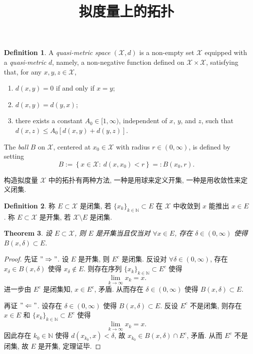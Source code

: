 \documentclass[a4paper,11pt]{article}
\title{拟度量上的拓扑}
\newtheorem{theorem}{Theorem}[section]
\theoremstyle{definition}
\newtheorem{definition}[theorem]{Definition}
\begin{document}
\maketitle

\begin{definition} \label{10.21.1}
A \emph{quasi-metric space} $ (\mathcal{X}, d) $ is a non-empty set $ \mathcal{X} $ equipped with a \emph{quasi-metric} $ d $,
namely, a non-negative function defined on $ \mathcal{X} \times \mathcal{X} $, satisfying that, for any $ x, y, z \in \mathcal{X} $,
    \begin{enumerate}[{\rm(i)}]
        \item $ d(x, y) = 0 $ if and only if $ x = y $;
        \item $ d(x, y) = d(y, x) $;
        \item there exists a constant $ A_0 \in [1, \infty) $, independent of $ x $, $ y $,
            and $ z $, such that $ d(x, z) \leq A_0 [d(x, y) + d(y, z)] $.
    \end{enumerate}
\end{definition}

The \emph{ball} $ B $ on $ \mathcal{X} $, centered at $ x_0 \in \mathcal{X} $ with radius $ r \in (0, \infty) $, 
is defined by setting
$$
    B := \left\{x \in \mathcal{X} :\ d(x, x_0) < r \right\} =: B \left( x_0, r \right).
$$

构造拟度量 $ \mathcal{X} $ 中的拓扑有两种方法, 一种是用球来定义开集, 一种是用收敛性来定义闭集.


\begin{definition} \label{def1}
    称 $ E \subset \mathcal{X} $ 是闭集, 若 $ \{x_k\}_{k \in \mathbb{N}} \subset E $ 在 $ \mathcal{X} $ 中收敛到 $ x $ 
    能推出 $ x \in E $.
    称 $ E \subset \mathcal{X} $ 是开集, 若 $ \mathcal{X} \setminus E $ 是闭集.
\end{definition}

\begin{theorem}
    设 $ E \subset \mathcal{X} $, 则 $ E $ 是开集当且仅当对 $ \forall x \in E $, 
    存在 $ \delta \in (0, \infty) $ 使得 $ B(x, \delta) \subset E $.
\end{theorem}

\begin{proof}
    先证 $ "\Rightarrow" $. 设 $ E $ 是开集, 则 $ E^c $ 是闭集.
    反设对 $ \forall \delta \in (0, \infty) $, 存在 $ x_\delta \in B(x, \delta) $ 使得 $ x_\delta \notin E $. 
    则存在序列 $ \{x_k\}_{k \in \mathbb{N}} \subset E^c $ 使得
    $$
        \lim_{k \to \infty} x_k = x.
    $$
    进一步由 $ E^c $ 是闭集知, $ x \in E^c $, 矛盾. 
    从而存在 $ \delta \in (0, \infty) $ 使得 $ B(x, \delta) \subset E $.
    
    再证 $ "\Leftarrow" $. 设存在 $ \delta \in (0, \infty) $ 使得 $ B(x, \delta) \subset E $.
    反设 $ E^c $ 不是闭集, 则存在 $ x \in E $ 和 $ \{x_k\}_{k \in \mathbb{N}} \subset E^c $ 使得 
    $$
        \lim_{k \to \infty} x_k = x.
    $$
    因此存在 $ k_0 \in \mathbb{N} $ 使得 $ d(x_{k_0}, x) < \delta $, 故 $ x_{k_0} \in B(x, \delta) \cap E^c $, 矛盾.
    从而 $ E^c $ 不是闭集, 故 $ E $ 是开集, 定理证毕.
\end{proof}
\end{document}
